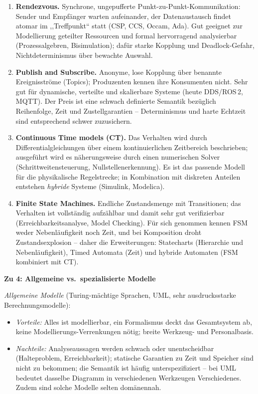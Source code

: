 \begin{loesung}
\begin{enumerate}[label=(\alph*)]
          sind im Allgemeinen unentscheidbar.
    \item \textbf{Rendezvous.} Synchrone, ungepufferte Punkt-zu-Punkt-Kommunikation: Sender und
          Empfänger warten aufeinander, der Datenaustausch findet atomar im ,,Treffpunkt`` statt
          (CSP, CCS, Occam, Ada). Gut geeignet zur Modellierung geteilter Ressourcen und formal
          hervorragend analysierbar (Prozessalgebren, Bisimulation); dafür starke Kopplung und
          Deadlock-Gefahr, Nichtdeterminismus über bewachte Auswahl.
    \item \textbf{Publish and Subscribe.} Anonyme, lose Kopplung über benannte Ereignisströme
          (Topics); Produzenten kennen ihre Konsumenten nicht. Sehr gut für dynamische, verteilte und
          skalierbare Systeme (heute DDS/ROS\,2, MQTT). Der Preis ist eine schwach definierte
          Semantik bezüglich Reihenfolge, Zeit und Zustellgarantien -- Determinismus und harte
          Echtzeit sind entsprechend schwer zuzusichern.
    \item \textbf{Continuous Time models (CT).} Das Verhalten wird durch Differentialgleichungen über
          einem kontinuierlichen Zeitbereich beschrieben; ausgeführt wird es näherungsweise durch
          einen numerischen Solver (Schrittweitensteuerung, Nullstellenerkennung). Es ist das
          passende Modell für die physikalische Regelstrecke; in Kombination mit diskreten Anteilen
          entstehen \emph{hybride} Systeme (Simulink, Modelica).
    \item \textbf{Finite State Machines.} Endliche Zustandsmenge mit Transitionen; das Verhalten ist
          vollständig aufzählbar und damit sehr gut verifizierbar (Erreichbarkeitsanalyse, Model
          Checking). Für sich genommen kennen FSM weder Nebenläufigkeit noch Zeit, und bei
          Komposition droht Zustandsexplosion -- daher die Erweiterungen: Statecharts (Hierarchie und
          Nebenläufigkeit), Timed Automata (Zeit) und hybride Automaten (FSM kombiniert mit CT).
\end{enumerate}

\textbf{Zu 4: Allgemeine vs.\ spezialisierte Modelle}

\emph{Allgemeine Modelle} (Turing-mächtige Sprachen, UML, sehr ausdrucksstarke Berechnungsmodelle):
\begin{itemize}
    \item \emph{Vorteile:} Alles ist modellierbar, ein Formalismus deckt das Gesamtsystem ab, keine
          Modellierungs-Verrenkungen nötig; breite Werkzeug- und Personalbasis.
    \item \emph{Nachteile:} Analyseaussagen werden schwach oder unentscheidbar (Halteproblem,
          Erreichbarkeit); statische Garantien zu Zeit und Speicher sind nicht zu bekommen; die
          Semantik ist häufig unterspezifiziert -- bei UML bedeutet dasselbe Diagramm in
          verschiedenen Werkzeugen Verschiedenes. Zudem sind solche Modelle selten domänennah.
\end{itemize}


\end{loesung}

